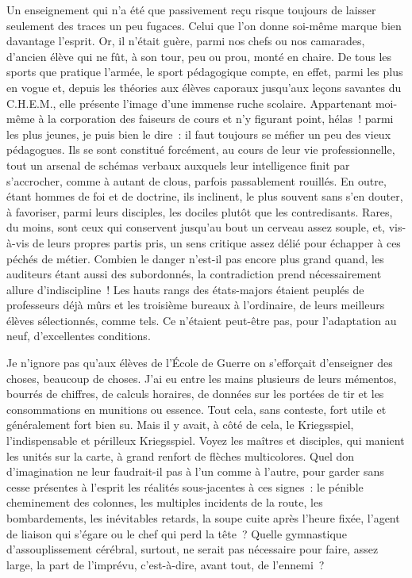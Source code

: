 \documentclass[french,twoside]{book} %
\begin{document}
Un enseignement qui n’a été que passivement reçu risque toujours de laisser seulement des traces un peu fugaces. Celui que l’on donne soi-même marque bien davantage l’esprit. Or, il n’était guère, parmi nos chefs ou nos camarades, d’ancien élève qui ne fût, à son tour, peu ou prou, monté en chaire. De tous les sports que pratique l’armée, le sport pédagogique compte, en effet, parmi les plus en vogue et, depuis les théories aux élèves caporaux jusqu’aux leçons savantes du C.H.E.M., elle présente l’image d’une immense ruche scolaire. Appartenant moi-même à la corporation des faiseurs de cours et n’y figurant point, hélas ! parmi les plus jeunes, je puis bien le dire : il faut toujours se méfier un peu des vieux pédagogues. Ils se sont constitué forcément, au cours de leur vie professionnelle, tout un arsenal de schémas verbaux auxquels leur intelligence finit par s’accrocher, comme à autant de clous, parfois passablement rouillés. En outre, étant hommes de foi et de doctrine, ils inclinent, le plus souvent sans s’en douter, à favoriser, parmi leurs disciples, les dociles plutôt que les contredisants. Rares, du moins, sont ceux qui conservent jusqu’au bout un cerveau assez souple, et, vis-à-vis de leurs propres partis pris, un sens critique assez délié pour échapper à ces péchés de métier. Combien le danger n’est-il pas encore plus grand quand, les auditeurs étant aussi des subordonnés, la contradiction prend nécessairement allure d’indiscipline ! Les hauts rangs des états-majors étaient peuplés de professeurs déjà mûrs et les troisième bureaux à l’ordinaire, de leurs meilleurs élèves sélectionnés, comme tels. Ce n’étaient peut-être pas, pour l’adaptation au neuf, d’excellentes conditions.\par
Je n’ignore pas qu’aux élèves de l’École de Guerre on s’efforçait d’enseigner des choses, beaucoup de choses. J’ai eu entre les mains plusieurs de leurs   mémentos, bourrés de chiffres, de calculs horaires, de données sur les portées de tir et les consommations en munitions ou essence. Tout cela, sans conteste, fort utile et généralement fort bien su. Mais il y avait, à côté de cela, le Kriegsspiel, l’indispensable et périlleux Kriegsspiel. Voyez les maîtres et disciples, qui manient les unités sur la carte, à grand renfort de flèches multicolores. Quel don d’imagination ne leur faudrait-il pas à l’un comme à l’autre, pour garder sans cesse présentes à l’esprit les réalités sous-jacentes à ces signes : le pénible cheminement des colonnes, les multiples incidents de la route, les bombardements, les inévitables retards, la soupe cuite après l’heure fixée, l’agent de liaison qui s’égare ou le chef qui perd la tête ? Quelle gymnastique d’assouplissement cérébral, surtout, ne serait pas nécessaire pour faire, assez large, la part de l’imprévu, c’est-à-dire, avant tout, de l’ennemi ?\par
\end{document}
